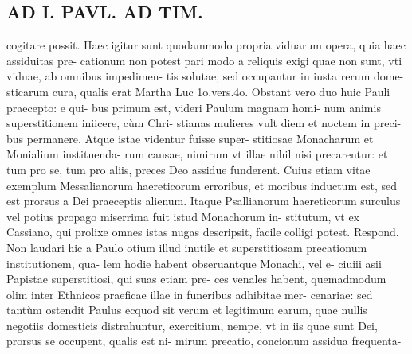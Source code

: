 \documentclass{article}
\begin{document}
\begin{pages}
\section*{AD I. PAVL. AD TIM. }
\marginpar{[ p.260 ]}\pstart cogitare possit. Haec igitur sunt quodammodo propria viduarum opera, quia haec assiduitas pre- cationum non potest pari modo a reliquis exigi quae non sunt, vti viduae, ab omnibus impedimen- tis solutae, sed occupantur in iusta rerum dome- sticarum cura, qualis erat Martha Luc 1o.vers.4o.  \pend\pstart Obstant vero duo huic Pauli praecepto: e qui- bus primum est, videri Paulum magnam homi- num animis superstitionem iniicere, cùm Chri- stianas mulieres vult diem et noctem in preci- bus permanere. Atque istae videntur fuisse super- stitiosae Monacharum et Monialium instituenda- rum causae, nimirum vt illae nihil nisi precarentur: et tum pro se, tum pro aliis, preces Deo assidue funderent.  \pend\pstart Cuius etiam vitae exemplum Messalianorum haereticorum erroribus, et moribus inductum est, sed est prorsus a Dei praeceptis alienum. Itaque  Psallianorum haereticorum surculus vel potius propago miserrima fuit istud Monachorum in- stitutum, vt ex Cassiano, qui prolixe omnes istas nugas descripsit, facile colligi potest. Respond. Non laudari hic a Paulo otium illud inutile et superstitiosam precationum institutionem, qua- lem hodie habent obseruantque Monachi, vel e- ciuiii asii Papistae superstitiosi, qui suas etiam pre- ces venales habent, quemadmodum olim inter Ethnicos praeficae illae in funeribus adhibitae mer- cenariae: sed tantùm ostendit Paulus ecquod sit verum et legitimum earum, quae nullis negotiis domesticis distrahuntur, exercitium, nempe, vt in iis quae sunt Dei, prorsus se occupent, qualis est ni- mirum precatio, concionum assidua frequenta-  \pend

\end{pages}
\end{document}
